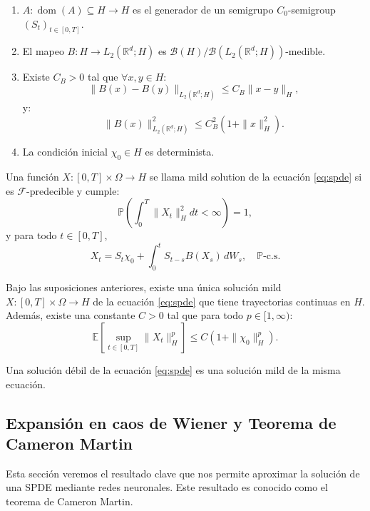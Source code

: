\begin{enumerate}
  \item $A: \operatorname{dom}(A) \subseteq H \rightarrow H$ es el generador de un semigrupo $C_0$-semigroup $\left(S_t\right)_{t \in[0, T]}$.
  \item El mapeo $B: H \rightarrow L_2\left(\mathbb{R}^d ; H\right)$ es $\mathcal{B}(H)/ \mathcal{B}\left(L_2\left(\mathbb{R}^d ; H\right)\right)$-medible.
  \item Existe $C_B>0$ tal que $\forall x,y \in H$:
    \[
      \|B(x) - B(y)\|_{L_2(\mathbb{R}^d;H)} \leq C_{B} \|x - y\|_H,
    \]
    y:
    \[
      \|B(x)\|_{L_2(\mathbb{R}^d;H)}^2 \leq C_{B}^2 (1 + \|x\|_H^2).
    \]
  \item La condición inicial $\chi_0 \in H$ es determinista.
\end{enumerate}

\begin{defn}
  Una función $X: [0,T] \times \Omega \to H$ se llama mild solution de la ecuación \eqref{eq:spde} si es $\mathcal{F}$-predecible y cumple:
  \[
    \mathbb{P}\left( \int_0^T \|X_t\|_H^2 dt < \infty \right) = 1,
  \]
  y para todo $t \in [0, T]$,
  \begin{equation}\label{eq:mild}
    X_t = S_t \chi_0 + \int_0^t S_{t-s} B(X_s) \, dW_s, \quad \mathbb{P}\text{-c.s.}
  \end{equation}
\end{defn}

\begin{teo}
  Bajo las suposiciones anteriores, existe una única solución mild $X: [0,T] \times \Omega \to H$ de la ecuación \eqref{eq:spde} que tiene trayectorias continuas en $H$. Además, existe una constante $C > 0$ tal que para todo $p \in [1,\infty)$:
  \[
    \mathbb{E}\left[ \sup_{t \in [0,T]} \|X_t\|_H^p \right] \leq C (1 + \|\chi_0\|_H^p).
  \]
\end{teo}

\begin{prop}[]
  Una solución débil de la ecuación \eqref{eq:spde} es una solución mild de la misma ecuación.
\end{prop}

\subsection{Expansión en caos de Wiener y Teorema de Cameron Martin}

Esta sección veremos el resultado clave que nos permite aproximar la solución de una SPDE mediante redes neuronales. Este resultado es conocido como el teorema de Cameron Martin.

